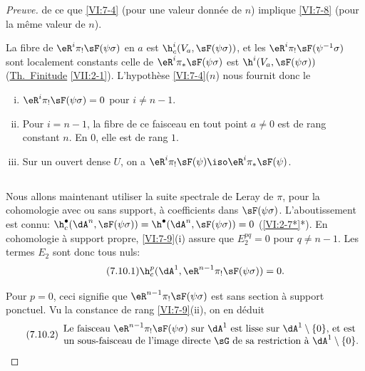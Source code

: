 \begin{proof}[Preuve]
de ce que \ref{VI:7-4} (pour une valeur donnée de $n$) implique \ref{VI:7-8} 
(pour la même valeur de $n$). 

La fibre de $\eR^i \pi_! \sF(\psi\sigma)$ en $a$ est 
$\h_c^i(V_a,\sF(\psi\sigma))$, et  les 
$\eR^i \pi_!\sF(\psi^{-1}\sigma)$ sont localement constants celle de 
$\eR^i \pi_\ast \sF(\psi\sigma)$ est $\h^i(V_a,\sF(\psi\sigma))$ 
(\hyperref[VII]{Th.\ Finitude} \ref{VII:2-1}). L'hypothèse \ref{VI:7-4}($n$) 
nous fournit donc le 





\begin{lemma_}\label{VI:7-9}
\begin{enumerate}[(i)]
  \item $\eR^i \pi_! \sF(\psi\sigma)=0$ pour $i\ne n-1$. 
  \item Pour $i=n-1$, la fibre de ce faisceau en tout point $a\ne 0$ est de rang 
    constant $n$. En $0$, elle est de rang $1$. 
  \item Sur un ouvert dense $U$, on a 
    $\eR^i \pi_! \sF(\psi) \iso \eR^i \pi_\ast \sF(\psi)$. 
\end{enumerate}
\end{lemma_}





\subsection{}\label{VI:7-10}

Nous allons maintenant utiliser la suite spectrale de Leray de $\pi$, pour la 
cohomologie avec ou sans support, à coefficients dans $\sF(\psi\sigma)$. 
L'aboutissement est connu: 
$\h_c^\bullet(\dA^n,\sF(\psi\sigma))=\h^\bullet(\dA^n,\sF(\psi\sigma)) = 0$ 
(\ref{VI:2-7*}*). En cohomologie à support propre, \ref{VI:7-9}(i) assure que 
$E_2^{pq}=0$ pour $q\ne n-1$. Les termes $E_2$ sont donc tous nuls: 
\begin{equation*}\tag{7.10.1}\label{VI:eq:7-10-1}
  \h_c^p(\dA^1,\eR^{n-1} \pi_!\sF(\psi\sigma)) = 0 \text{.} 
\end{equation*}

Pour $p=0$, ceci signifie que $\eR^{n-1}\pi_! \sF(\psi\sigma)$ est sans section 
à support ponctuel. Vu la constance de rang \ref{VI:7-9}(ii), on en déduit 
\begin{equation*}\tag{7.10.2}\label{VI:eq:7-10-2}
  \begin{array}{c}
    \text{Le faisceau $\eR^{n-1} \pi_! \sF(\psi\sigma)$ sur $\dA^1$ est lisse sur $\dA^1\setminus \{0\}$, et est } \\ 
    \text{un sous-faisceau de l'image directe $\sG$ de sa restriction à $\dA^1\setminus \{0\}$.}
  \end{array}
\end{equation*}


\end{proof}
